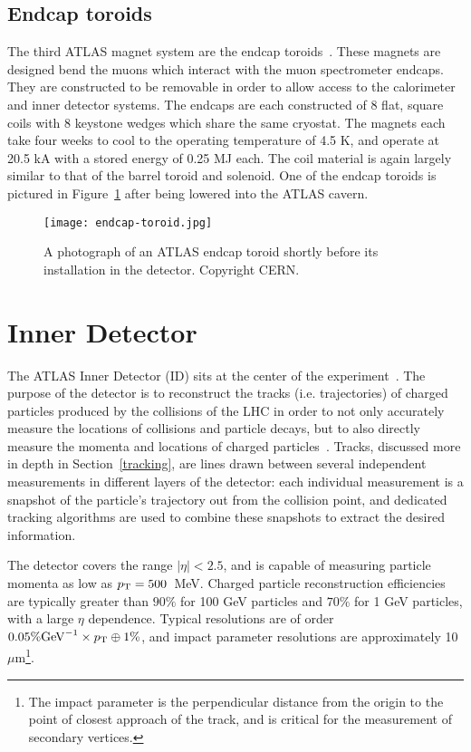 
\subsection{Endcap toroids}

The third ATLAS magnet system are the endcap toroids~\cite{ATLASPaper}. These magnets are designed bend the muons which interact with the muon spectrometer endcaps. They are constructed to be removable in order to allow access to the calorimeter and inner detector systems. The endcaps are each constructed of 8 flat, square coils with 8 keystone wedges which share the same cryostat. The magnets each take four weeks to cool to the operating temperature of 4.5 K, and operate at 20.5 kA with a stored energy of 0.25 MJ each. The coil material is again largely similar to that of the barrel toroid and solenoid. One of the endcap toroids is pictured in Figure~\ref{fig:detector:endcap-toroid} after being lowered into the ATLAS cavern.



\begin{figure}
\centering
\texttt{[image: endcap-toroid.jpg]}
\label{fig:detector:endcap-toroid}
\caption{A photograph of an ATLAS endcap toroid shortly before its installation in the detector. Copyright CERN.}
\end{figure}



\section{Inner Detector}

The ATLAS Inner Detector (ID) sits at the center of the experiment~\cite{ATLASPaper}. The purpose of the detector is to reconstruct the tracks (i.e. trajectories) of charged particles produced by the collisions of the LHC in order to not only accurately measure the locations of collisions and particle decays, but to also directly measure the momenta and locations of charged particles~\cite{ATLASExpected}. Tracks, discussed more in depth in Section~\ref{tracking}, are lines drawn between several independent measurements in different layers of the detector: each individual measurement is a snapshot of the particle's trajectory out from the collision point, and dedicated tracking algorithms are used to combine these snapshots to extract the desired information.

The detector covers the range $|\eta| < 2.5$, and is capable of measuring particle momenta as low as $p_{\text{T}} = 500$~MeV. Charged particle reconstruction efficiencies are typically greater than $90\%$ for 100 GeV particles and $70\%$ for 1 GeV particles, with a large $\eta$ dependence. Typical \pT resolutions are of order $0.05\% \mathrm{GeV}^{-1} \times p_{\text{T}} \oplus 1\%$, and impact parameter resolutions are approximately 10 $\mu$m\footnote{The impact parameter is the perpendicular distance from the origin to the point of closest approach of the track, and is critical for the measurement of secondary vertices.}. 

